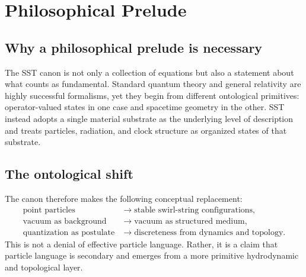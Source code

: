 \documentclass[11pt]{article}
\theoremstyle{definition}
\theoremstyle{plain}
\theoremstyle{remark}
\renewcommand{\cftsecfont}{\footnotesize}
\renewcommand{\cftsubsecfont}{\footnotesize\itshape}
\newcommand{\compacttoc}{%
    \begingroup
    \setlength{\cftparskip}{0pt}%
    \setlength{\cftbeforesecskip}{0.5pt}%
    \setlength{\cftbeforesubsecskip}{0.5pt}%
    \renewcommand{\cftsecfont}{\scriptsize}%
    \renewcommand{\cftsubsecfont}{\scriptsize\itshape}%
    \renewcommand{\cftsecpagefont}{\scriptsize}%
    \renewcommand{\cftsubsecpagefont}{\scriptsize}%
    \setlength{\cftsecnumwidth}{2.8em}%
    \setlength{\cftsubsecindent}{1.4em}%
    \renewcommand{\cftdotsep}{2}%
    \setlength{\parskip}{0pt}%
    \linespread{0.80}\selectfont
    \tableofcontents
    \endgroup
}
\begin{document}
    \newpage
    \compacttoc
    \newpage



    \section{Philosophical Prelude}
        \label{sec:philosophy}

    \subsection{Why a philosophical prelude is necessary}
        The SST canon is not only a collection of equations but also a statement about what counts as fundamental. Standard quantum theory and general relativity are highly successful formalisms, yet they begin from different ontological primitives: operator-valued states in one case and spacetime geometry in the other. SST instead adopts a single material substrate as the underlying level of description and treats particles, radiation, and clock structure as organized states of that substrate.

    \subsection{The ontological shift}
        The canon therefore makes the following conceptual replacement:
        \begin{align}
            \text{point particles} &\longrightarrow \text{stable swirl-string configurations}, \\
            \text{vacuum as background} &\longrightarrow \text{vacuum as structured medium}, \\
            \text{quantization as postulate} &\longrightarrow \text{discreteness from dynamics and topology}.
        \end{align}
        This is not a denial of effective particle language. Rather, it is a claim that particle language is secondary and emerges from a more primitive hydrodynamic and topological layer.
\end{document}
